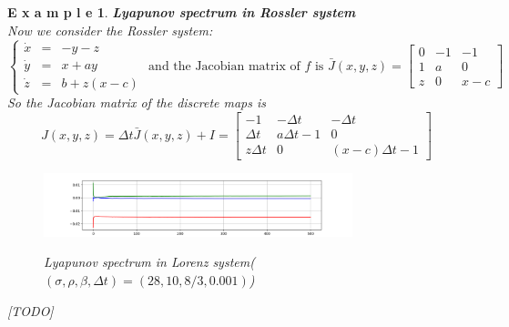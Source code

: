 \documentclass[12pt]{article}
\theoremstyle{plain}
\newtheorem{example}{\textbf{E x a m p l e}}[section]
\begin{document}
\begin{example}\textbf{Lyapunov spectrum in Rossler system}
\\\noindent Now we consider the Rossler system:
$$
\left\{\begin{array}{lll}
\dot x & = & -y-z \\
\dot y & = & x+ay \\
\dot z & = & b+z(x-c)
\end{array}\right. \text{ and the Jacobian matrix of $f$ is } \bar J(x, y, z) = \left[\begin{array}{lll}
0           & -1        & -1        \\
1           & a         & 0         \\
z           & 0         & x-c
\end{array}\right]
$$
So the Jacobian matrix of the discrete maps is 
$$
J(x, y, z) = \Delta t\bar J(x, y, z) + I = \left[\begin{array}{lll}
-1                  & -\Delta t         & -\Delta t         \\
\Delta t            & a\Delta t -1      & 0                 \\
z\Delta t           & 0                 & (x-c)\Delta t - 1
\end{array}\right]
$$
\begin{figure}[H]
\begin{center}
\includegraphics[width=0.8\textwidth]{figure/section3/Lya-spec-Lorenz-1.png} \\
\caption{Lyapunov spectrum in Lorenz system($(\sigma, \rho, \beta, \Delta t) = (28, 10, 8/3, 0.001)$)}
\end{center}
\end{figure}
{\color{red}[TODO]}
\end{example}
\end{document}
